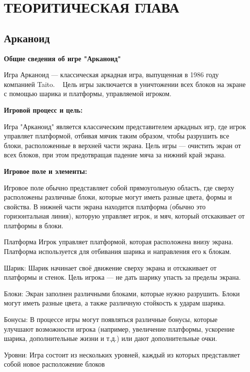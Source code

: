 \chapter{\label{ch:ch01}ТЕОРИТИЧЕСКАЯ ГЛАВА} %

\section{\label{sec:ch01/sec01} Арканоид}

\textbf{Общие сведения об игре "Арканоид"}

Игра Арканоид — классическая аркадная игра, выпущенная в 1986 году компанией Taito.
~\cite{wikiRUArkanoid} Цель игры заключается в уничтожении всех блоков на экране с помощью шарика и платформы, управляемой игроком. 

\textbf{Игровой процесс и цель:} ~\cite{wikiRUHabr7}

Игра "Арканоид" является классическим представителем аркадных игр, где игрок управляет платформой, отбивая мячик таким образом, чтобы разрушить все блоки, расположенные в верхней части экрана. Цель игры — очистить экран от всех блоков, при этом предотвращая падение мяча за нижний край экрана.

\textbf{Игровое поле и элементы:}

Игровое поле обычно представляет собой прямоугольную область, где сверху расположены различные блоки, которые могут иметь разные цвета, формы и свойства. В нижней части экрана находится платформа (обычно это горизонтальная линия), которую управляет игрок, и мяч, который отскакивает от платформы в блоки.

    Платформа Игрок управляет платформой, которая расположена внизу экрана. Платформа используется для отбивания шарика и направления его к блокам.

    Шарик: Шарик начинает своё движение сверху экрана и отскакивает от платформы и стенок. Цель игрока — не дать шарику упасть за пределы экрана.

    Блоки: Экран заполнен различными блоками, которые нужно разрушить. Блоки могут иметь разные цвета, а также различную стойкость к ударам шарика.

    Бонусы: В процессе игры могут появляться различные бонусы, которые улучшают возможности игрока (например, увеличение платформы, ускорение шарика, дополнительные жизни и т.д.) или дают дополнительные очки.

    Уровни: Игра состоит из нескольких уровней, каждый из которых представляет собой новое расположение блоков

